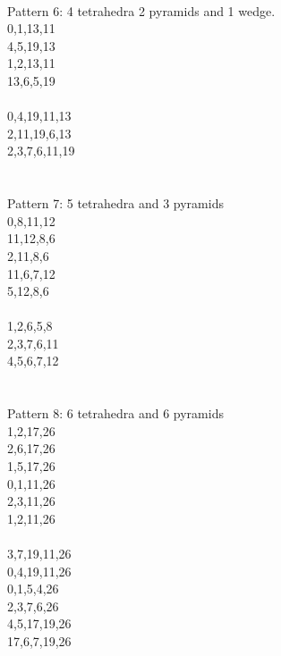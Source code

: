 \documentclass[twocolumn]{article}
\begin{document}
 \\
\tiny Pattern 6: 4 tetrahedra 2 pyramids and 1 wedge. \\
\tiny 0,1,13,11\\
\tiny 4,5,19,13 \\
\tiny 1,2,13,11 \\
\tiny 13,6,5,19 \\
\tiny    \\
\tiny 0,4,19,11,13 \\
\tiny 2,11,19,6,13 \\
\tiny 2,3,7,6,11,19 \\
\tiny    \\
 
 \\
\tiny Pattern 7: 5 tetrahedra and 3 pyramids \\
\tiny 0,8,11,12 \\
\tiny 11,12,8,6 \\
\tiny 2,11,8,6 \\
\tiny 11,6,7,12 \\
\tiny 5,12,8,6 \\
\tiny   \\
\tiny 1,2,6,5,8 \\
\tiny 2,3,7,6,11 \\
\tiny 4,5,6,7,12 \\
\tiny   \\




 \\ 
\tiny Pattern 8: 6 tetrahedra and 6 pyramids \\
        1,2,17,26 \\
        2,6,17,26 \\
        1,5,17,26 \\
        0,1,11,26 \\
        2,3,11,26 \\
        1,2,11,26 \\
 \\
        3,7,19,11,26 \\ 
        0,4,19,11,26 \\ 
        0,1,5,4,26 \\ 
        2,3,7,6,26 \\ 
        4,5,17,19,26 \\ 
        17,6,7,19,26 \\ 
        \\
        \\    
\end{document}
